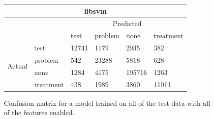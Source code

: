 \documentclass[preprint]{style}
\begin{document}
\begin{figure}[t]
\begin{center}
\begin{tabular}{|l|l|l|l|l|l|}
	\end{tabular}
\end{center}
		
\begin{center}
	\begin{tabular}{|l|l|l|l|l|l|}
	\hline
	\multicolumn{6}{|c|}{\bf libsvm} \\ \hline
	& & \multicolumn{4}{|c|}{Predicted} \\ \cline{2-6}
	& & test & problem & none & treatment \\ \cline{2-6}
	\multirow{4}{*}{\begin{sideways}Actual\end{sideways}}
		& test & 12741 & 1179 & 2935 & 382	\\ \cline{2-6}
		& problem & 542 & 23288 & 5818 & 628	\\ \cline{2-6}
		& none & 1284 & 4175 & 195716 & 1263	\\ \cline{2-6}
		& treatment & 438 & 1989 & 3860 & 11011	\\ \hline

	\end{tabular}
\end{center}

\caption{Confusion matrix for a model trained on all of the test data with all of the features enabled.}
\label{fig:all_confusion_matrix}
\end{figure}
\end{document}
